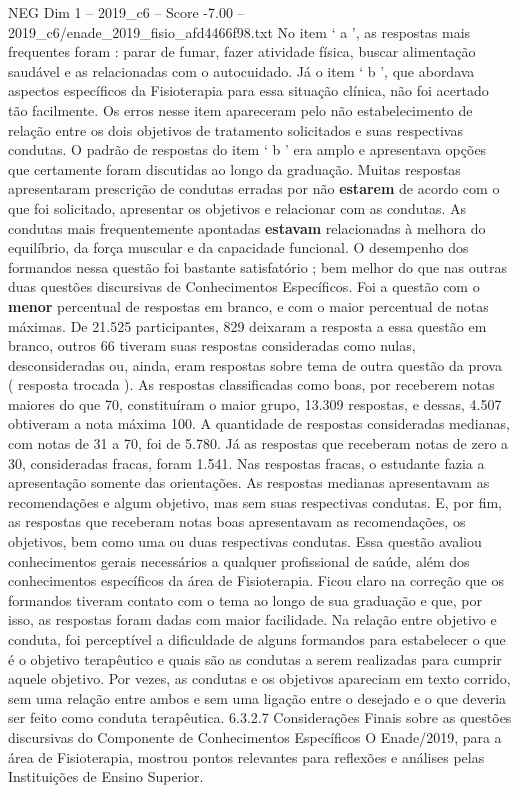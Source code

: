 \begin{textsample}{NEG Dim 1 – 2019\_c6 – Score -7.00 – 2019\_c6/enade\_2019\_fisio\_afd4466f98.txt}
No item ‘ a ’, as respostas mais frequentes foram : parar de fumar, fazer atividade física, buscar alimentação saudável e as relacionadas com o autocuidado.
Já o item ‘ b ’, que abordava aspectos específicos da Fisioterapia para essa situação clínica, não foi acertado tão facilmente.
Os erros nesse item apareceram pelo não estabelecimento de relação entre os dois objetivos de tratamento solicitados e suas respectivas condutas.
O padrão de respostas do item ‘ b ’ era amplo e apresentava opções que certamente foram discutidas ao longo da graduação.
Muitas respostas apresentaram prescrição de condutas erradas por não \textbf{estarem} de acordo com o que foi solicitado, apresentar os objetivos e relacionar com as condutas.
As condutas mais frequentemente apontadas \textbf{estavam} relacionadas à melhora do equilíbrio, da força muscular e da capacidade funcional.
O desempenho dos formandos nessa questão foi bastante satisfatório ; bem melhor do que nas outras duas questões discursivas de Conhecimentos Específicos.
Foi a questão com o \textbf{menor} percentual de respostas em branco, e com o maior percentual de notas máximas.
De 21.525 participantes, 829 deixaram a resposta a essa questão em branco, outros 66 tiveram suas respostas consideradas como nulas, desconsideradas ou, ainda, eram respostas sobre tema de outra questão da prova ( resposta trocada ).
As respostas classificadas como boas, por receberem notas maiores do que 70, constituíram o maior grupo, 13.309 respostas, e dessas, 4.507 obtiveram a nota máxima 100.
A quantidade de respostas consideradas medianas, com notas de 31 a 70, foi de 5.780.
Já as respostas que receberam notas de zero a 30, consideradas fracas, foram 1.541.
Nas respostas fracas, o estudante fazia a apresentação somente das orientações.
As respostas medianas apresentavam as recomendações e algum objetivo, mas sem suas respectivas condutas.
E, por fim, as respostas que receberam notas boas apresentavam as recomendações, os objetivos, bem como uma ou duas respectivas condutas.
Essa questão avaliou conhecimentos gerais necessários a qualquer profissional de saúde, além dos conhecimentos específicos da área de Fisioterapia.
Ficou claro na correção que os formandos tiveram contato com o tema ao longo de sua graduação e que, por isso, as respostas foram dadas com maior facilidade.
Na relação entre objetivo e conduta, foi perceptível a dificuldade de alguns formandos para estabelecer o que é o objetivo terapêutico e quais são as condutas a serem realizadas para cumprir aquele objetivo.
Por vezes, as condutas e os objetivos apareciam em texto corrido, sem uma relação entre ambos e sem uma ligação entre o desejado e o que deveria ser feito como conduta terapêutica. 6.3.2.7 Considerações Finais sobre as questões discursivas do Componente de Conhecimentos Específicos O Enade/2019, para a área de Fisioterapia, mostrou pontos relevantes para reflexões e análises pelas Instituições de Ensino Superior.

\end{textsample}
